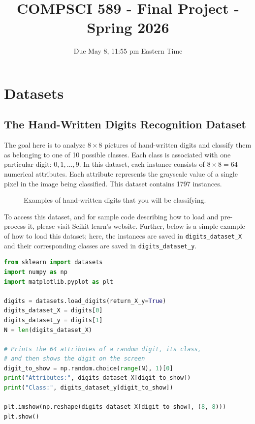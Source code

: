 \documentclass[11pt]{article}
\title{COMPSCI 589 - Final Project - Spring 2026}
\date{Due May 8, 11:55 pm Eastern Time}
\begin{document}
\maketitle


\section{Datasets}


\subsection{The Hand-Written Digits Recognition Dataset}

The goal here is to analyze $8 \times 8$ pictures of hand-written digits and classify them as belonging to one of 10 possible classes. Each class is associated with one particular digit: $0, 1, \ldots, 9$. In this dataset, each instance consists of $8 \times 8 = 64$ numerical attributes. Each attribute represents the grayscale value of a single pixel in the image being classified. This dataset contains 1797 instances.

\begin{figure}[H]
    \centering
    \caption{Examples of hand-written digits that you will be classifying.}
\end{figure}

To access this dataset, and for sample code describing how to load and pre-process it, please visit Scikit-learn's website. Further, below is a simple example of how to load this dataset; here, the instances are saved in \texttt{digits\_dataset\_X} and their corresponding classes are saved in \texttt{digits\_dataset\_y}.

\begin{lstlisting}[language=Python, caption={Example showing how to load the Digits dataset from Scikit-learn and how to display information about a random digit from the dataset.}]
from sklearn import datasets
import numpy as np
import matplotlib.pyplot as plt

digits = datasets.load_digits(return_X_y=True)
digits_dataset_X = digits[0]
digits_dataset_y = digits[1]
N = len(digits_dataset_X)

# Prints the 64 attributes of a random digit, its class,
# and then shows the digit on the screen
digit_to_show = np.random.choice(range(N), 1)[0]
print("Attributes:", digits_dataset_X[digit_to_show])
print("Class:", digits_dataset_y[digit_to_show])

plt.imshow(np.reshape(digits_dataset_X[digit_to_show], (8, 8)))
plt.show()
\end{lstlisting}
\end{document}
